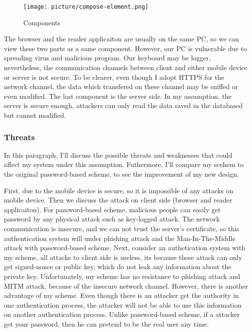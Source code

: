 \begin{CJK}{Bg5}{bsmi}
\begin{figure}
\centering
\texttt{[image: picture/compose-element.png]}
\caption{Components}
\label{fig:compose-element}
\end{figure}

The browser and the reader applicaiton are usually on the same PC, so we can view these two parts as a same component. However, our PC is vulnerable due to spreading virus and malicious program. Our keyboard may be logger, nevertheless, the communication channels between client and either mobile device or server is not secure. To be clearer, even though I adopt HTTPS for the network channel, the data which transfered on these channel may be sniffed or even modified. The last component is the server side. In my assumption, the server is secure enough, attackers can only read the data saved in the databased but cannot modified.

\subsubsection{Threats}

In this paragraph, I'll discuss the possible threats and weaknesses that could affect my system under this assumption. Futhermore, I'll compare my scehem to the original password-based scheme, to see the improvement of my new design.

First, due to the mobile device is secure, so it is impossible of any attacks on mobile device. Then we discuss the attack on client side (browser and reader applicaiton). For password-based scheme, malicious people can easily get password by any physical attack such as key-logged attack. The network communication is insecure, and we can not trust the server's certificate, so this authentication system will under phishing attack and the Man-In-The-Middle attack with password-based scheme. Next, consider an authetication system with my scheme, all attacks to client side is useless, its because these attack can only get signed-nonce or public key, which do not leak any information about the private key. Unfortunately, my scheme has no resistance to phishing attack and MITM attack, because of the insecure network channel. However, there is another advantage of my scheme. Even though there is an attacker get the authority in one authentication process, the attacker will not be able to use this information on another authentication process. Unlike password-based scheme, if a attacker get your password, then he can pretend to be the real user any time.


\end{CJK}
